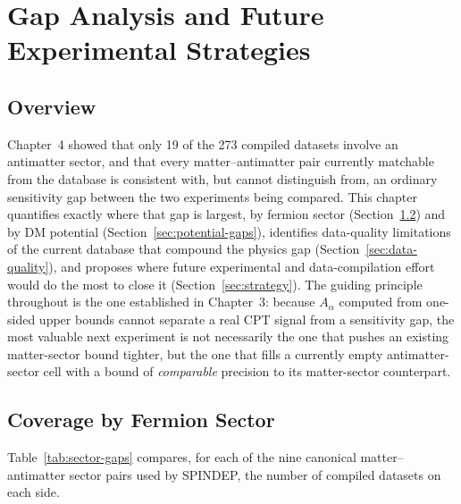 \documentclass[main]{subfiles}
\begin{document}
\ifSubfilesClassLoaded{\setcounter{chapter}{4}}{}
\chapter{Gap Analysis and Future Experimental Strategies}

\section{Overview}

Chapter~4 showed that only 19 of the 273 compiled datasets involve an
antimatter sector, and that every matter--antimatter pair currently
matchable from the database is consistent with, but cannot distinguish
from, an ordinary sensitivity gap between the two experiments being
compared. This chapter quantifies exactly where that gap is largest,
by fermion sector (Section~\ref{sec:sector-gaps}) and by DM potential
(Section~\ref{sec:potential-gaps}), identifies data-quality limitations of
the current database that compound the physics gap
(Section~\ref{sec:data-quality}), and proposes where future experimental and
data-compilation effort would do the most to close it
(Section~\ref{sec:strategy}). The guiding principle throughout is the one
established in Chapter~3: because $A_\alpha$ computed from one-sided upper
bounds cannot separate a real CPT signal from a sensitivity gap, the most
valuable next experiment is not necessarily the one that pushes an existing
matter-sector bound tighter, but the one that fills a currently empty
antimatter-sector cell with a bound of \emph{comparable} precision to its
matter-sector counterpart.

\section{Coverage by Fermion Sector}
\label{sec:sector-gaps}

Table~\ref{tab:sector-gaps} compares, for each of the nine canonical
matter--antimatter sector pairs used by SPINDEP, the number of compiled
datasets on each side.
\end{document}
